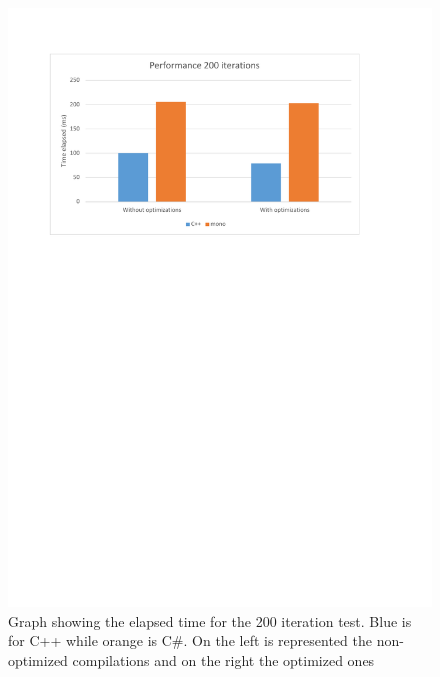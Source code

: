 \begin{figure}[H]\begin{center}
 \centering
  \captionsetup{justification=centering}
  \includegraphics[scale=0.9,page=1]{pictures/performance-tests/GPIO/graphs}
  \caption{Graph showing the elapsed time for the 200 iteration test. Blue is for C++ while orange is C\#. On the left is represented the non-optimized compilations and on the right the optimized ones\label{fig:gpio-graph-200}}
\end{center}\end{figure}

